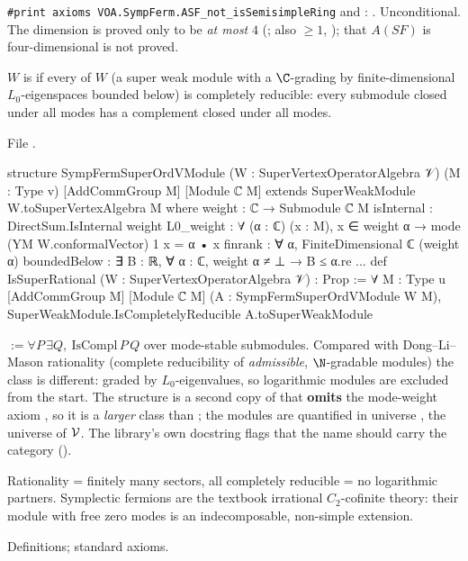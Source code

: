 \begin{status}
\texttt{\#print axioms VOA.SympFerm.ASF\_not\_isSemisimpleRing} and
: . Unconditional. The dimension is proved only to be \emph{at most} $4$ (; also
$\ge1$, ); that $A(SF)$ is four-dimensional is not proved.
\end{status}

\begin{definition}\label{l17:def:superrat}
$W$ is  if every  of $W$ (a super weak module with
a $\C$-grading by finite-dimensional $L_0$-eigenspaces bounded below) is completely reducible: every
submodule closed under all modes has a complement closed under all modes.
\end{definition}
\noindent File .
\begin{leancode}
structure SympFermSuperOrdVModule (W : SuperVertexOperatorAlgebra 𝒱) (M : Type v)
    [AddCommGroup M] [Module ℂ M] extends SuperWeakModule W.toSuperVertexAlgebra M where
  weight : ℂ → Submodule ℂ M
  isInternal : DirectSum.IsInternal weight
  L0_weight : ∀ (α : ℂ) (x : M), x ∈ weight α → mode (YM W.conformalVector) 1 x = α • x
  finrank : ∀ α, FiniteDimensional ℂ (weight α)
  boundedBelow : ∃ B : ℝ, ∀ α : ℂ, weight α ≠ ⊥ → B ≤ α.re
...
def IsSuperRational (W : SuperVertexOperatorAlgebra 𝒱) : Prop :=
  ∀ {M : Type u} [AddCommGroup M] [Module ℂ M] (A : SympFermSuperOrdVModule W M),
    SuperWeakModule.IsCompletelyReducible A.toSuperWeakModule
\end{leancode}
\begin{dictionary}
 $:=\forall P\,\exists Q,\ \mathrm{IsCompl}\,P\,Q$ over mode-stable
submodules. Compared with Dong--Li--Mason rationality (complete reducibility of \emph{admissible},
$\N$-gradable modules) the class is different: graded by $L_0$-eigenvalues, so logarithmic modules
are excluded from the start. The structure is a second copy of  that
\textbf{omits} the mode-weight axiom , so it is a \emph{larger} class than
; the modules are quantified in universe , the universe of $\mathcal{V}$.
The library's own docstring flags that the name should carry the category ().
\end{dictionary}
\begin{physics}
Rationality = finitely many sectors, all completely reducible = no logarithmic partners. Symplectic
fermions are the textbook irrational $C_2$-cofinite theory: their module with free zero modes is an
indecomposable, non-simple extension.
\end{physics}
\begin{status}
Definitions; standard axioms.
\end{status}

